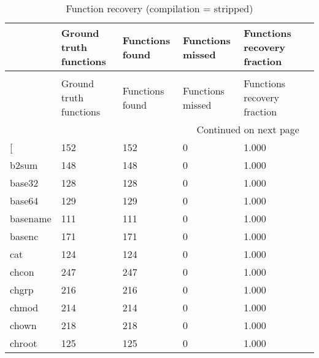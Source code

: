 \begin{longtable}{lp{2.40cm}p{2.40cm}p{2.40cm}p{2.40cm}p{2.40cm}}
\caption{Function recovery (compilation = stripped)}
\label{table:functions-O0-strip}\\
\toprule
{} &  Ground truth functions &  Functions found &  Functions missed &  Functions recovery fraction \\
\midrule
\endfirsthead
\caption[]{Function recovery (compilation = stripped)} \\
\toprule
{} &  Ground truth functions &  Functions found &  Functions missed &  Functions recovery fraction \\
\midrule
\endhead
\midrule
\multicolumn{5}{r}{{Continued on next page}} \\
\midrule
\endfoot

\bottomrule
\endlastfoot
{[}         &                     152 &              152 &                 0 &                        1.000 \\
b2sum     &                     148 &              148 &                 0 &                        1.000 \\
base32    &                     128 &              128 &                 0 &                        1.000 \\
base64    &                     129 &              129 &                 0 &                        1.000 \\
basename  &                     111 &              111 &                 0 &                        1.000 \\
basenc    &                     171 &              171 &                 0 &                        1.000 \\
cat       &                     124 &              124 &                 0 &                        1.000 \\
chcon     &                     247 &              247 &                 0 &                        1.000 \\
chgrp     &                     216 &              216 &                 0 &                        1.000 \\
chmod     &                     214 &              214 &                 0 &                        1.000 \\
chown     &                     218 &              218 &                 0 &                        1.000 \\
chroot    &                     125 &              125 &                 0 &                        1.000 \\

\end{longtable}
